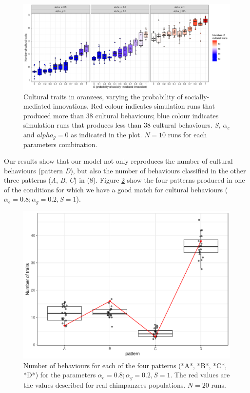 \documentclass[9pt,twocolumn,twoside,]{pnas-new}
\begin{document}
\begin{figure}[h!]
\begin{center}
\includegraphics[width=17.8cm]{figures/figure_2.pdf}
\caption{Cultural traits in oranzees, varying the probability of socially-mediated innovations. Red colour indicates simulation runs that produced more than 38 cultural behaviours; blue colour indicates simulation runs that produces less than 38 cultural behaviours. $S$, $\alpha_e$ and $alpha_g=0$ as indicated in the plot. $N=10$ runs for each parameters combination.}
\label{Figure2}
\end{center}
\end{figure}

Our results show that our model not only reproduces the number of
cultural behaviours (pattern \emph{D}), but also the number of
behaviours classified in the other three patterns (\emph{A}, \emph{B},
\emph{C}) in (8). Figure \ref{Figure3} show the four patterns produced
in one of the conditions for which we have a good match for cultural
behaviours (\(\alpha_e=0.8;\alpha_g=0.2, S=1\)).

\begin{figure}[h!]
\begin{center}
\includegraphics[width=11.4cm]{figures/figure_3.pdf}
\caption{Number of behaviours for each of the four patterns (*A*, *B*, *C*, *D*) for the parameters $\alpha_e=0.8;\alpha_g=0.2,S=1$. The red values are the values described for real chimpanzees populations. $N=20$ runs.}
\label{Figure3}
\end{center}
\end{figure}
\end{document}
